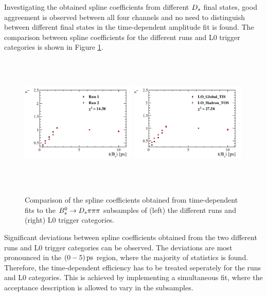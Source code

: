 Investigating the obtained spline coefficients from different ${{D}_{s}}$ final states, 
good aggreement is observed between all four channels and no need to distinguish between different final states in the time-dependent amplitude fit is found. \newline
The comparison between spline coefficients for the different runs and L0 trigger categories is shown in Figure \ref{fig:AccCompRunTrig}.


\begin{figure}[h]
\includegraphics[height=6.5cm,width=0.49\textwidth]{figs/timeAcc_combined_by_run_adaptive.pdf}
\includegraphics[height=6.5cm,width=0.49\textwidth]{figs/timeAcc_combined_by_trigger_adaptive.pdf}
\caption{Comparison of the spline coefficients obtained from time-dependent fits to the ${{B}^0_{s}}\rightarrow{\ensuremath{{D}_{s}}}{\ensuremath{\pi}}{\ensuremath{\pi}}{\ensuremath{\pi}}$ subsamples of (left) the different runs and (right) L0 trigger categories.}
\label{fig:AccCompRunTrig}
\end{figure}


Significant deviations between spline coefficients obtained from the two different runs and L0 trigger categories can be observed. 
The deviations are most pronounced in the $(0-5) {\mathrm{ \,ps}}$ region, where the majority of statistics is found. 
Therefore, the time-dependent efficiency has to be treated seperately for the runs and L0 categories. 
This is achieved by implementing a simultaneous fit, where the acceptance description is allowed to vary in the subsamples.   
